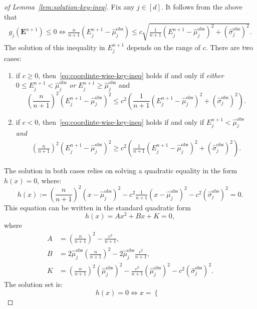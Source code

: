 \begin{proof}[of Lemma~\ref{lem:solution-key-ineq}]
Fix any $j\in [d]$. It follows from the above that
\begin{align}
    g_j(\mathbf{E}^{n+1}) \leq 0 \iff \frac{n}{n+1}\left(E^{n+1}_j-\hat{\mu}^\mathrm{obs}_j\right) \leq c\sqrt{\frac{1}{n+1}\left(E^{n+1}_j-\hat{\mu}^\mathrm{obs}_j\right)^2+(\hat{\sigma}^\mathrm{obs}_j)^2}.
    \label{eq:coordinte-wise-key-ineq}
\end{align}
The solution of this inequality in $E^{n+1}_j$ depends on the range of $c$. There are two cases:
\begin{enumerate}
\item if $c \geq 0$, then~\eqref{eq:coordinte-wise-key-ineq} holds if and only if \emph{either} $0\leq E^{n+1}_j < \hat{\mu}^\mathrm{obs}_j$ \emph{or} $E^{n+1}_j \geq \hat{\mu}^\mathrm{obs}_j$ and
    \[
    \left(\frac{n}{n+1}\right)^2\left(E^{n+1}_j-\hat{\mu}^\mathrm{obs}_j\right)^2 \leq c^2\left(\frac{1}{n+1}(E^{n+1}_j-\hat{\mu}^\mathrm{obs}_j)^2 + (\hat{\sigma}^\mathrm{obs}_j)^2\right).
    \]
\item if $c < 0$, then~\eqref{eq:coordinte-wise-key-ineq} holds if and only if $E^{n+1}_j <  \hat{\mu}^\mathrm{obs}_j$ \emph{and}
    \begin{align*}
        \left(\frac{n}{n+1}\right)^2\left(E^{n+1}_j-\hat{\mu}^\mathrm{obs}_j\right)^2 \geq c^2\left(\tfrac{1}{n+1}\left(E^{n+1}_j-\hat{\mu}^\mathrm{obs}_j\right)^2 + (\hat{\sigma}^\mathrm{obs}_j)^2\right).
    \end{align*}
  \end{enumerate}
  The solution in both cases relies on solving a quadratic equality in the form $h(x) = 0$, where:
\[
h(x):=\left(\frac{n}{n+1}\right)^2\left(x-\hat{\mu}^\mathrm{obs}_j\right)^2 - c^2\tfrac{1}{n+1}\left(x-\hat{\mu}^\mathrm{obs}_j\right)^2 - c^2(\hat{\sigma}^\mathrm{obs}_j)^2 = 0.
\]
This equation can be written in the standard quadratic form
\[
h(x)= Ax^2+Bx +K = 0,
\]
where
\begin{align*}
 A & = \left(\frac{n}{n+1}\right)^2 - \frac{c^2}{n+1}, \\
 B & = 2\hat{\mu}^\mathrm{obs}_j\left(\frac{n}{n+1}\right)^2-2\hat{\mu}^\mathrm{obs}_j \frac{c^2}{n+1}, \\
 K & = \left(\frac{n}{n+1}\right)^2(\hat{\mu}^\mathrm{obs}_j)^2-\frac{c^2}{n+1}(\hat{\mu}^\mathrm{obs}_j)^2-c^2(\hat{\sigma}^\mathrm{obs}_j)^2.
\end{align*}
The solution set is:
\[h(x) = 0 \iff x=
\begin{cases}

\end{cases}\]
\end{proof}
